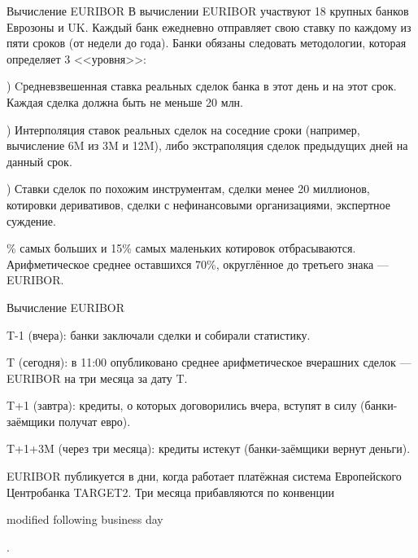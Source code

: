 \documentclass{beamer}
\newcommand{\en}[1]{\begin{otherlanguage}{english}#1\end{otherlanguage}}
\begin{document}
\begin{frame}{Вычисление EURIBOR}
\justify
В вычислении EURIBOR участвуют 18 крупных банков Еврозоны и UK. Каждый банк ежедневно отправляет свою ставку по каждому из пяти сроков (от недели до года). Банки обязаны следовать методологии, которая определяет 3 <<уровня>>:

) Cредневзвешенная ставка реальных сделок банка в этот день и на этот срок. Каждая сделка должна быть не меньше 20 млн.

) Интерполяция ставок реальных сделок на соседние сроки (например, вычисление 6M из 3M и 12M), либо экстраполяция сделок предыдущих дней на данный срок.

) Ставки сделок по похожим инструментам, сделки менее 20 миллионов, котировки деривативов, сделки с нефинансовыми организациями, экспертное суждение. 

\% самых больших и 15\% самых маленьких котировок отбрасываются. Арифметическое среднее оставшихся 70\%, округлённое до третьего знака --- EURIBOR.
\end{frame}



\begin{frame}{Вычисление EURIBOR}
\centering
{}
	
\justify
T-1 (вчера):  банки заключали сделки и собирали статистику.

T (сегодня): в 11:00 опубликовано среднее арифметическое вчерашних сделок --- EURIBOR на три месяца за дату T.

T+1 (завтра): кредиты, о которых договорились вчера, вступят в силу (банки-заёмщики получат евро).

T+1+3M (через три месяца): кредиты истекут (банки-заёмщики вернут деньги).

\justify
EURIBOR публикуется в дни, когда работает платёжная система Европейского Центробанка TARGET2. Три месяца прибавляются по конвенции \en{modified following business day}.
\end{frame}
\end{document}
